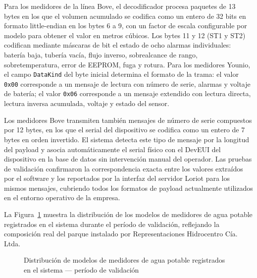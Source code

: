 \documentclass[12pt,a4paper,oneside]{report}
\begin{document}
Para los medidores de la línea Bove, el decodificador procesa paquetes de 13 bytes en los que el volumen acumulado se codifica como un entero de 32 bits en formato little-endian en los bytes 6 a 9, con un factor de escala configurable por modelo para obtener el valor en metros cúbicos. Los bytes 11 y 12 (ST1 y ST2) codifican mediante máscaras de bit el estado de ocho alarmas individuales: batería baja, tubería vacía, flujo inverso, sobrealcance de rango, sobretemperatura, error de EEPROM, fuga y rotura. Para los medidores Younio, el campo \texttt{DataKind} del byte inicial determina el formato de la trama: el valor \texttt{0x00} corresponde a un mensaje de lectura con número de serie, alarmas y voltaje de batería; el valor \texttt{0x06} corresponde a un mensaje extendido con lectura directa, lectura inversa acumulada, voltaje y estado del sensor.

Los medidores Bove transmiten también mensajes de número de serie compuestos por 12 bytes, en los que el serial del dispositivo se codifica como un entero de 7 bytes en orden invertido. El sistema detecta este tipo de mensaje por la longitud del payload y asocia automáticamente el serial físico con el DevEUI del dispositivo en la base de datos sin intervención manual del operador. Las pruebas de validación confirmaron la correspondencia exacta entre los valores extraídos por el software y los reportados por la interfaz del servidor Loriot para los mismos mensajes, cubriendo todos los formatos de payload actualmente utilizados en el entorno operativo de la empresa.

La Figura~\ref{fig:pie-modelos} muestra la distribución de los modelos de medidores de agua potable registrados en el sistema durante el período de validación, reflejando la composición real del parque instalado por Representaciones Hidrocentro Cía. Ltda.

\begin{figure}[H]
\centering
{}
\caption{Distribución de modelos de medidores de agua potable registrados en el sistema --- período de validación}
\label{fig:pie-modelos}
\end{figure}
\end{document}
